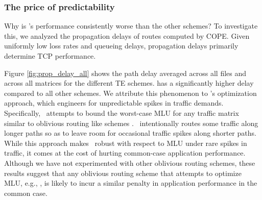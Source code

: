   
 
%
%


\subsubsection{The price of predictability}
Why is \cope's performance consistently worse than the other schemes? To investigate this, we analyzed the propagation delays of routes computed by COPE. Given uniformly low loss rates and queueing delays, propagation delays primarily determine TCP performance.

Figure \ref{fig:prop_delay_all} shows the path delay averaged across all files and across all matrices for the different TE schemes. \cope{} has a significantly higher delay compared to all other schemes. We attribute this phenomenon to \cope{}'s optimization approach, which engineers for unpredictable spikes in traffic demands. Specifically, \cope\ attempts to bound the worst-case MLU for any traffic matrix similar to oblivious routing like schemes \cite{Cohen}. \cope\ intentionally routes some traffic along longer paths so as to leave room for occasional traffic spikes along shorter paths. While this approach makes \cope\ robust with respect to MLU under rare spikes in traffic, it comes at the cost of hurting common-case application performance.  Although we have not experimented with other oblivious routing schemes, these results suggest that any oblivious routing scheme that attempts to optimize MLU, e.g., \cite{Cohen}, is likely to incur a similar penalty in  application performance in the common case. 




